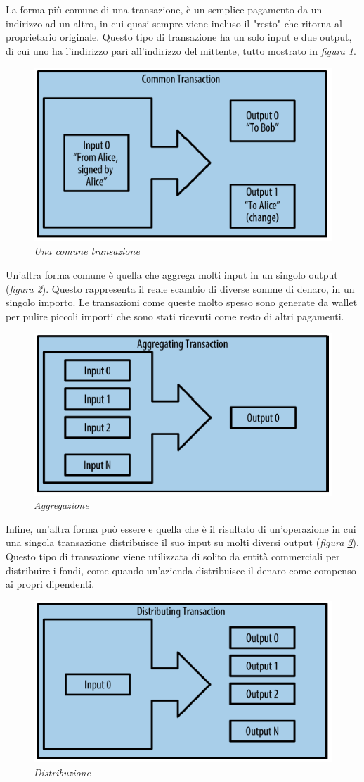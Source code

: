 La forma più comune di una transazione, è un semplice pagamento da un indirizzo ad un altro, in cui quasi sempre viene incluso il "resto" che ritorna al proprietario originale. Questo tipo di transazione ha un solo input e due output, di cui uno ha l'indirizzo pari all'indirizzo del mittente, tutto mostrato in \textit{figura \ref{fig:commontx}}.
\begin{figure}[htbp]
	\centering
	\includegraphics[width=0.5 \linewidth]{figure/commontx}
	\caption{\textit{Una comune transazione} \label{fig:commontx}}
\end{figure}

Un'altra forma comune è quella che aggrega molti input in un singolo output (\textit{figura \ref{fig:aggregatingtxs}}). Questo rappresenta il reale scambio di diverse somme di denaro, in un singolo importo. Le transazioni come queste molto spesso sono generate da wallet per pulire piccoli importi che sono stati ricevuti come resto di altri pagamenti.
\begin{figure}[htbp]
	\centering
	\includegraphics[width=0.5 \linewidth]{figure/aggregatingtxs}
	\caption{\textit{Aggregazione} \label{fig:aggregatingtxs}}
\end{figure}

Infine, un'altra forma può essere e quella che è il risultato di un'operazione in cui una singola transazione distribuisce il suo input su molti diversi output (\textit{figura \ref{fig:distributingtxs}}). Questo tipo di transazione viene utilizzata di solito da entità commerciali per distribuire i fondi, come quando un'azienda distribuisce il denaro come compenso ai propri dipendenti.	\cite{antonopoulos2014mastering}
\begin{figure}[htbp]
	\centering
	\includegraphics[width=0.5 \linewidth]{figure/distributingtxs}
	\caption{\textit{Distribuzione} \label{fig:distributingtxs}}
\end{figure}

